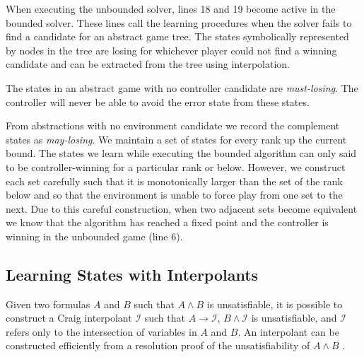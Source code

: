 \documentclass{llncs}
\begin{document}
When executing the unbounded solver, lines 18 and 19 become active in the
bounded solver. These lines call the learning procedures when the solver fails
to find a candidate for an abstract game tree. The states symbolically
represented by nodes in the tree are losing for whichever player could not find
a winning candidate and can be extracted from the tree using interpolation.

The states in an abstract game with no controller candidate are
\emph{must-losing}. The controller will never be able to avoid the error state
from these states.

From abstractions with no environment candidate we record the complement states
as \emph{may-losing}. We maintain a set of states for every rank up the current
bound. The states we learn while executing the bounded algorithm can only said
to be controller-winning for a particular rank or below. However, we construct
each set carefully such that it is monotonically larger than the set of the
rank below
and so that the environment is unable to force play from one set to the next.
Due to this careful construction, when two adjacent sets become equivalent we
know that the algorithm has reached a fixed point and the controller is winning
in the unbounded game (line 6).



\subsection{Learning States with Interpolants}

Given two formulas $A$ and $B$ such that $A \land B$ is unsatisfiable, it is
possible to construct a Craig interpolant\cite{craig1957} $\mathcal{I}$ such
that $A \to \mathcal{I}$, $B \land \mathcal{I}$ is unsatisfiable, and
$\mathcal{I}$ refers only to the intersection of variables in $A$ and $B$.  An
interpolant can be constructed efficiently from a resolution proof of the
unsatisfiability of $A \land B$ \cite{pudlak1997}.
\end{document}
